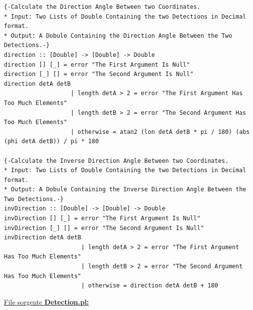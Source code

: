 \documentclass{article}
\begin{document}
\begin{lstlisting}
{-Calculate the Direction Angle Between two Coordinates.
* Input: Two Lists of Double Containing the two Detections in Decimal format.
* Output: A Dobule Containing the Direction Angle Between the Two Detections.-}
direction :: [Double] -> [Double] -> Double 
direction [] [_] = error "The First Argument Is Null"
direction [_] [] = error "The Second Argument Is Null"
direction detA detB 
                   | length detA > 2 = error "The First Argument Has Too Much Elements"
                   | length detB > 2 = error "The Second Argument Has Too Much Elements"
                   | otherwise = atan2 (lon detA detB * pi / 180) (abs (phi detA detB)) / pi * 180

{-Calculate the Inverse Direction Angle Between two Coordinates.
* Input: Two Lists of Double Containing the two Detections in Decimal format.
* Output: A Dobule Containing the Inverse Direction Angle Between the Two Detections.-}
invDirection :: [Double] -> [Double] -> Double
invDirection [] [_] = error "The First Argument Is Null"
invDirection [_] [] = error "The Second Argument Is Null"
invDirection detA detB 
                      | length detA > 2 = error "The First Argument Has Too Much Elements"
                      | length detB > 2 = error "The Second Argument Has Too Much Elements"
                      | otherwise = direction detA detB + 180
\end{lstlisting}
\newpage
\raggedright
\underline{File sorgente \textbf{Detection.pl:}}
\lstset{language=Prolog}
\end{document}
